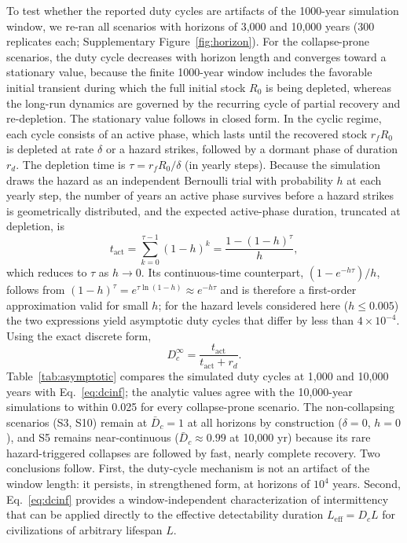 \documentclass[11pt]{article}
\begin{document}
To test whether the reported duty cycles are artifacts of the 1000-year simulation window, we re-ran all scenarios with horizons of 3,000 and 10,000 years (300 replicates each; Supplementary Figure~\ref{fig:horizon}). For the collapse-prone scenarios, the duty cycle decreases with horizon length and converges toward a stationary value, because the finite 1000-year window includes the favorable initial transient during which the full initial stock $R_0$ is being depleted, whereas the long-run dynamics are governed by the recurring cycle of partial recovery and re-depletion. The stationary value follows in closed form. In the cyclic regime, each cycle consists of an active phase, which lasts until the recovered stock $r_f R_0$ is depleted at rate $\delta$ or a hazard strikes, followed by a dormant phase of duration $r_d$. The depletion time is $\tau = r_f R_0 / \delta$ (in yearly steps). Because the simulation draws the hazard as an independent Bernoulli trial with probability $h$ at each yearly step, the number of years an active phase survives before a hazard strikes is geometrically distributed, and the expected active-phase duration, truncated at depletion, is
\begin{equation}
t_{\mathrm{act}} = \sum_{k=0}^{\tau-1} (1-h)^{k} = \frac{1 - (1-h)^{\tau}}{h} ,
\label{eq:tact}
\end{equation}
which reduces to $\tau$ as $h \to 0$. Its continuous-time counterpart, $(1 - e^{-h\tau})/h$, follows from $(1-h)^{\tau} = e^{\tau \ln(1-h)} \approx e^{-h\tau}$ and is therefore a first-order approximation valid for small $h$; for the hazard levels considered here ($h \leq 0.005$) the two expressions yield asymptotic duty cycles that differ by less than $4\times10^{-4}$. Using the exact discrete form,
\begin{equation}
D_c^{\infty} = \frac{t_{\mathrm{act}}}{t_{\mathrm{act}} + r_d} .
\label{eq:dcinf}
\end{equation}
Table~\ref{tab:asymptotic} compares the simulated duty cycles at 1,000 and 10,000 years with Eq.~\eqref{eq:dcinf}; the analytic values agree with the 10,000-year simulations to within 0.025 for every collapse-prone scenario. The non-collapsing scenarios (S3, S10) remain at $\bar{D}_c = 1$ at all horizons by construction ($\delta = 0$, $h = 0$), and S5 remains near-continuous ($\bar{D}_c \approx 0.99$ at 10,000 yr) because its rare hazard-triggered collapses are followed by fast, nearly complete recovery. Two conclusions follow. First, the duty-cycle mechanism is not an artifact of the window length: it persists, in strengthened form, at horizons of $10^4$ years. Second, Eq.~\eqref{eq:dcinf} provides a window-independent characterization of intermittency that can be applied directly to the effective detectability duration $L_{\mathrm{eff}} = D_c L$ for civilizations of arbitrary lifespan $L$.
\end{document}
